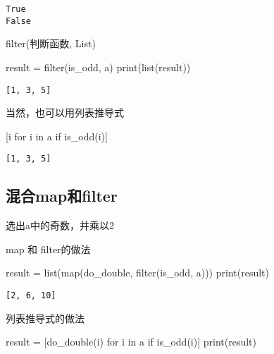 \documentclass[
  letterpaper,
  DIV=11,
  numbers=noendperiod]{scrreprt}
\newenvironment{Shaded}{\begin{snugshade}}{\end{snugshade}}
\newcommand{\BuiltInTok}[1]{\textcolor[rgb]{0.00,0.23,0.31}{#1}}
\newcommand{\ControlFlowTok}[1]{\textcolor[rgb]{0.00,0.23,0.31}{#1}}
\newcommand{\KeywordTok}[1]{\textcolor[rgb]{0.00,0.23,0.31}{#1}}
\newcommand{\NormalTok}[1]{\textcolor[rgb]{0.00,0.23,0.31}{#1}}
\newcommand{\OperatorTok}[1]{\textcolor[rgb]{0.37,0.37,0.37}{#1}}
\begin{document}
\begin{verbatim}
True
False
\end{verbatim}

filter(判断函数, List)

\begin{Shaded}
\begin{Highlighting}[]
\NormalTok{result }\OperatorTok{=} \BuiltInTok{filter}\NormalTok{(is\_odd, a)}
\BuiltInTok{print}\NormalTok{(}\BuiltInTok{list}\NormalTok{(result))}
\end{Highlighting}
\end{Shaded}

\begin{verbatim}
[1, 3, 5]
\end{verbatim}

当然，也可以用列表推导式

\begin{Shaded}
\begin{Highlighting}[]
\NormalTok{[i }\ControlFlowTok{for}\NormalTok{ i }\KeywordTok{in}\NormalTok{ a }\ControlFlowTok{if}\NormalTok{ is\_odd(i)]}
\end{Highlighting}
\end{Shaded}

\begin{verbatim}
[1, 3, 5]
\end{verbatim}

\hypertarget{ux6df7ux5408mapux548cfilter}{%
\subsection{混合map和filter}\label{ux6df7ux5408mapux548cfilter}}

选出a中的奇数，并乘以2

map 和 filter的做法

\begin{Shaded}
\begin{Highlighting}[]
\NormalTok{result }\OperatorTok{=} \BuiltInTok{list}\NormalTok{(}\BuiltInTok{map}\NormalTok{(do\_double, }\BuiltInTok{filter}\NormalTok{(is\_odd, a)))}
\BuiltInTok{print}\NormalTok{(result)}
\end{Highlighting}
\end{Shaded}

\begin{verbatim}
[2, 6, 10]
\end{verbatim}

列表推导式的做法

\begin{Shaded}
\begin{Highlighting}[]
\NormalTok{result }\OperatorTok{=}\NormalTok{ [do\_double(i) }\ControlFlowTok{for}\NormalTok{ i }\KeywordTok{in}\NormalTok{ a }\ControlFlowTok{if}\NormalTok{ is\_odd(i)]}
\BuiltInTok{print}\NormalTok{(result)}
\end{Highlighting}
\end{Shaded}
\end{document}
